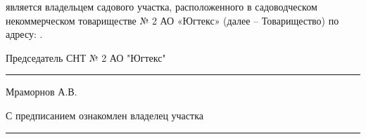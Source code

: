  является владельцем садового участка, расположенного в садоводческом некоммерческом товариществе № 2 АО «Югтекс» (далее – Товарищество) по адресу: .  






\vspace{5mm}



\vspace{15mm}
\noindent Председатель СНТ № 2 АО "Югтекс" \hfill    \rule{3cm}{0.1 mm}    Мраморнов А.В.

\vspace{15mm}
\noindent С предписанием ознакомлен   \hfill    владелец участка  \rule{3cm}{0.1 mm} 

%
%
%
%


